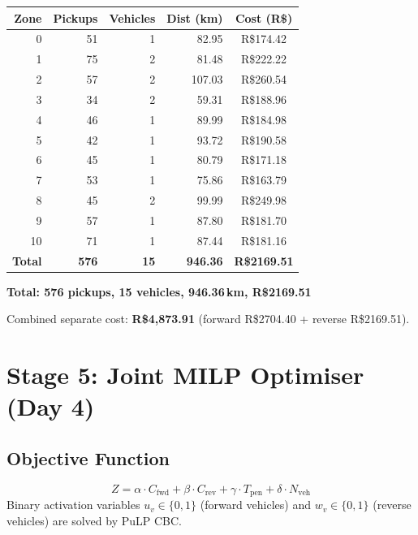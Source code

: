 \documentclass[11pt,a4paper]{article}
\begin{document}
\begin{tabular}{rrrrc}
      \toprule
      \textbf{Zone} & \textbf{Pickups} & \textbf{Vehicles} &
      \textbf{Dist (km)} & \textbf{Cost (R\$)} \\
      \midrule
        0 & 51 & 1 & 82.95 & R\$174.42 \\
1 & 75 & 2 & 81.48 & R\$222.22 \\
2 & 57 & 2 & 107.03 & R\$260.54 \\
3 & 34 & 2 & 59.31 & R\$188.96 \\
4 & 46 & 1 & 89.99 & R\$184.98 \\
5 & 42 & 1 & 93.72 & R\$190.58 \\
6 & 45 & 1 & 80.79 & R\$171.18 \\
7 & 53 & 1 & 75.86 & R\$163.79 \\
8 & 45 & 2 & 99.99 & R\$249.98 \\
9 & 57 & 1 & 87.80 & R\$181.70 \\
10 & 71 & 1 & 87.44 & R\$181.16 \\
      \midrule
      \textbf{Total} & \textbf{576} &
      \textbf{15} & \textbf{946.36} &
      \textbf{R\$2169.51} \\
      \bottomrule
      \end{tabular}

\vspace{0.5em}
\begin{center}
  \textbf{Total: 576 pickups, 15 vehicles,
  946.36\,km, R\$2169.51}
\end{center}

Combined separate cost:
\textbf{R\$4,873.91} (forward R\$2704.40 + reverse
R\$2169.51).

\section{Stage 5: Joint MILP Optimiser (Day 4)}

\subsection{Objective Function}
\begin{equation}
  Z = \alpha \cdot C_{\text{fwd}} + \beta \cdot C_{\text{rev}}
    + \gamma \cdot T_{\text{pen}} + \delta \cdot N_{\text{veh}}
  \label{eq:Z}
\end{equation}
Binary activation variables $u_v \in \{0,1\}$ (forward vehicles) and
$w_v \in \{0,1\}$ (reverse vehicles) are solved by PuLP CBC.
\end{document}
